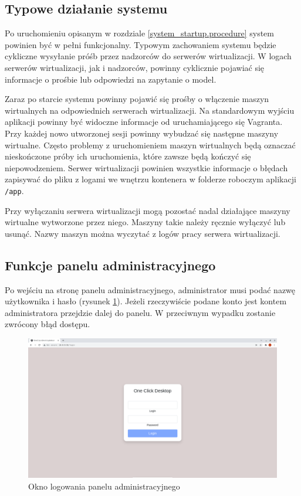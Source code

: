 \documentclass[../opis-rozwiazania.tex]{subfiles}
\begin{document}
\label{system_interaction}

\subsection{Typowe działanie systemu}
Po uruchomieniu opisanym w rozdziale \ref{system_startup.procedure} system powinien być w pełni funkcjonalny.
Typowym zachowaniem systemu będzie cykliczne wysyłanie próśb przez nadzorców do serwerów wirtualizacji.
W logach serwerów wirtualizacji, jak i nadzorców, powinny cyklicznie pojawiać się informacje o prośbie lub odpowiedzi na zapytanie o model.

Zaraz po starcie systemu powinny pojawić się prośby o włączenie maszyn wirtualnych na odpowiednich serwerach wirtualizacji.
Na standardowym wyjściu aplikacji powinny być widoczne informacje od uruchamiającego się Vagranta.
Przy każdej nowo utworzonej sesji powinny wybudzać się następne maszyny wirtualne.
Często problemy z uruchomieniem maszyn wirtualnych będą oznaczać nieskończone próby ich uruchomienia, które zawsze będą kończyć się niepowodzeniem.
Serwer wirtualizacji powinien wszystkie informacje o błędach zapisywać do pliku z logami we wnętrzu kontenera w folderze roboczym aplikacji \texttt{/app}.

Przy wyłączaniu serwera wirtualizacji mogą pozostać nadal działające maszyny wirtualne wytworzone przez niego.
Maszyny takie należy ręcznie wyłączyć lub usunąć.
Nazwy maszyn można wyczytać z logów pracy serwera wirtualizacji.

\subsection{Funkcje panelu administracyjnego}

Po wejściu na stronę panelu administracyjnego, administrator musi podać nazwę użytkownika i hasło (rysunek \ref{figure:system_interaction.admin.login}).
Jeżeli rzeczywiście podane konto jest kontem administratora przejdzie dalej do panelu.
W przeciwnym wypadku zostanie zwrócony błąd dostępu.

\begin{figure}[ht!]
  \centering
  \includegraphics[width=\textwidth]{resources/admin_panel_login.png}
  \caption{Okno logowania panelu administracyjnego}
  \label{figure:system_interaction.admin.login}
\end{figure}
\end{document}
